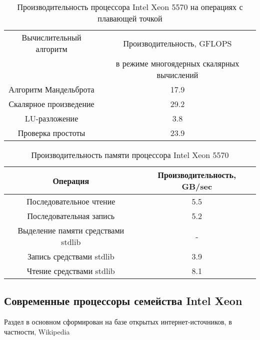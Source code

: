 \begin{table}[ht]
	\begin{center}
		\caption{Производительность процессора Intel Xeon  5570 на операциях с плавающей точкой}
		\begin{tabular}{|c|c|}
			\hline	
			Вычислительный алгоритм &  Производительность, GFLOPS \\ 
			& в режиме многоядерных скалярных вычислений \\ \hline
			Алгоритм Мандельброта  &  17.9 	\\ \hline
			Скалярное произведение &  29.2   \\ \hline
			LU-разложение          &  3.8  \\ \hline
			Проверка простоты      &  23.9  \\ \hline 
			
			
		\end{tabular}
	\end{center} 	
\end{table} 	

\begin{table}[ht]
	\begin{center}
		\caption{Производительность памяти процессора Intel Xeon 5570}
		\begin{tabular}{|c|c|}
			\hline	
			Операция  &  Производительность, GB/sec \\ \hline
			Последовательное чтение &  5.5 	\\  \hline
			Последовательная запись &  5.2   \\  \hline
			Выделение памяти средствами stdlib &  -  \\  \hline
			Запись средствами stdlib  & 3.9  \\ \hline
			Чтение средствами stdlib  & 8.1  \\ \hline 
		\end{tabular}
	\end{center} 	
\end{table} 	


\subsection{Современные процессоры семейства Intel Xeon}
Раздел в основном сформирован на базе открытых интернет-источников, в частности, Wikipedia 

